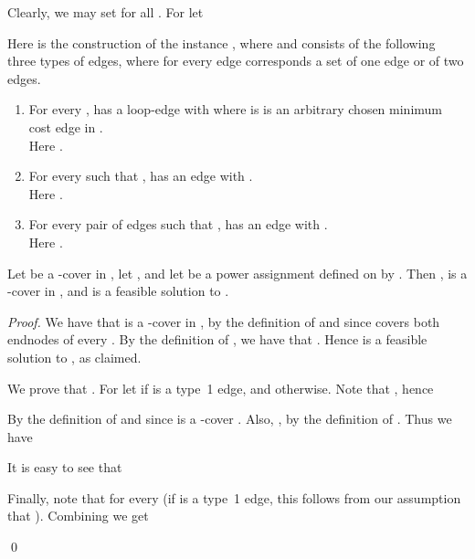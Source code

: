 \documentclass{llncs}
\begin{document}
Clearly, we may 
set  for all .
For  let 

Here is the construction of the instance , where  and  
consists of the following three types of edges, where for every edge 
corresponds a set  of one edge or of two edges.  

\begin{enumerate}
\item 
For every ,  has a loop-edge  with 
 where  is is an arbitrary chosen minimum cost edge 
in . \\
Here .
\item 
For every  such that ,  has an edge  with 
. \\
Here .
\item 
For every pair of edges  such that ,  has an edge  
with . \\
Here .
\end{enumerate}

\begin{lemma} \label{l:D}
Let  be a -cover in , 
let , and let  
be a power assignment defined on  by .
Then ,  is a -cover in ,
and  is a feasible solution to .
\end{lemma}
\begin{proof}
We have that  is a -cover in , by the definition of 
and since  covers both endnodes of every .  
By the definition of , we have that . 
Hence  is a feasible solution to , as claimed.

We prove that .
For  let  if  is a type~1 edge,
and  otherwise.
Note that 
, hence
 
By the definition of  and since  is a -cover
.
Also, , by the definition of .
Thus we have

It is easy to see that 

Finally, note that  for every  
(if  is a type~1 edge, this follows from our assumption that 
).
Combining we get

\qed
\end{proof}
\end{document}
